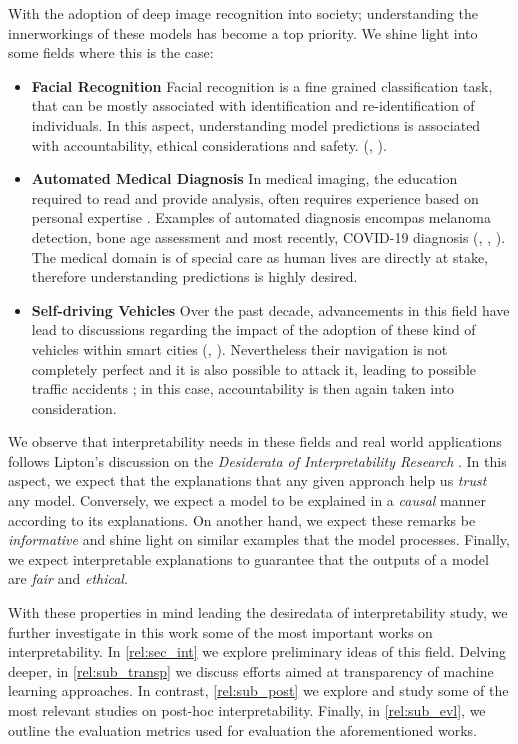 \noindent With the adoption of deep image recognition into society; understanding the 
innerworkings of these models has become a top priority. We shine light into some fields where 
this is the case:
\begin{itemize}
    \item \textbf{Facial Recognition} Facial recognition is a fine grained classification task, 
    that can be mostly associated with identification and re-identification of individuals. 
    In this aspect, understanding model predictions is associated with accountability, ethical 
    considerations and safety.
    (\cite{selinger2020inconsentability}, \cite{andrejevic2020facial}).
    \item \textbf{Automated Medical Diagnosis} In medical imaging, the education 
    required to read and provide analysis, often requires experience based 
    on personal expertise \autocite{nakashima2013visual}. Examples of automated diagnosis encompas 
    melanoma detection, bone age assessment and most recently, COVID-19 diagnosis (\cite{yu2016automated}, 
    \cite{BoNet2019hand}, \cite{huang2021artificial}). The medical domain is of special care 
    as human lives are directly at stake, therefore understanding predictions is highly desired.
    \item \textbf{Self-driving Vehicles} Over the past decade, advancements in this field have lead to 
    discussions regarding the impact of the adoption of these kind of vehicles within smart cities  
    (\cite{duarte2018impact}, \cite{millard2018pedestrians}). Nevertheless their 
    navigation is not completely perfect and it is also possible to attack it, leading to possible 
    traffic accidents \autocite{dixit2016autonomous}; in this case, accountability is then again 
    taken into consideration.
\end{itemize}

We observe that interpretability needs in these fields and real world applications follows 
Lipton's discussion on the \textit{Desiderata of Interpretability Research} 
\autocite{mythos_interp}. In this aspect, we expect that the explanations that any given 
approach help us \emph{trust} any model. Conversely, we expect a model to be explained in a 
\emph{causal} manner according to its explanations. On another hand, 
we expect these remarks be \emph{informative} and shine light on similar examples that the 
model processes. Finally, we expect interpretable explanations to guarantee that the outputs 
of a model are \emph{fair} and \emph{ethical}.

With these properties in mind leading the desiredata of interpretability study, we further 
investigate in this work some of the most important works on interpretability. In 
\autoref{rel:sec_int} we explore preliminary ideas of this field. Delving deeper, in 
\autoref{rel:sub_transp} we discuss efforts aimed at transparency of machine learning approaches. 
In contrast, \autoref{rel:sub_post} we explore and study 
some of the most relevant studies on post-hoc interpretability. Finally, in \autoref{rel:sub_evl}, 
we outline the evaluation metrics used for evaluation the aforementioned works.

\newpage

\newpage
